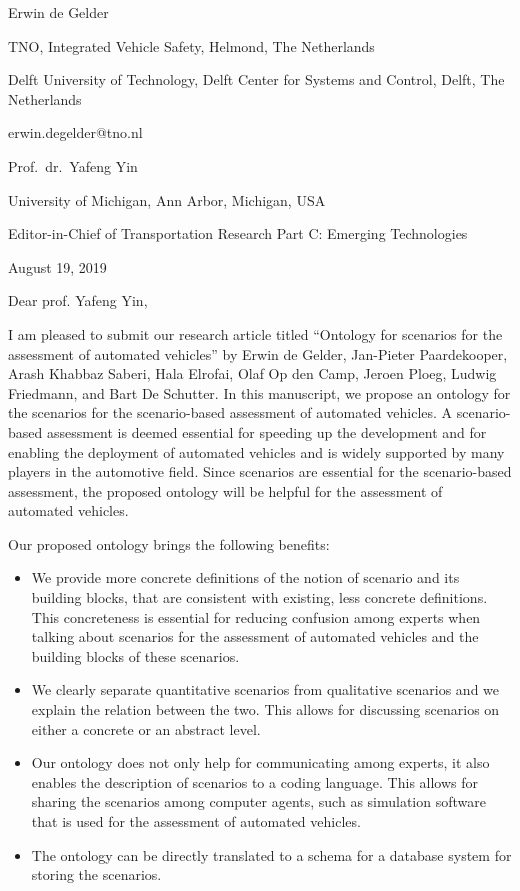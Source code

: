 \documentclass{article}
\begin{document}
Erwin de Gelder

TNO, Integrated Vehicle Safety, Helmond, The Netherlands

Delft University of Technology, Delft Center for Systems and Control, Delft, The Netherlands

erwin.degelder@tno.nl

\vspace{1em}

Prof.\ dr.\ Yafeng Yin

University of Michigan, Ann Arbor, Michigan, USA

Editor-in-Chief of Transportation Research Part C: Emerging Technologies

\vspace{1em}

August 19, 2019

\vspace{2em}


Dear prof. Yafeng Yin,

\vspace{1em}

I am pleased to submit our research article titled “Ontology for scenarios for the assessment of automated vehicles” by Erwin de Gelder, Jan-Pieter Paardekooper, Arash Khabbaz Saberi, Hala Elrofai, Olaf Op den Camp, Jeroen Ploeg, Ludwig Friedmann, and Bart De Schutter. In this manuscript, we propose an ontology for the scenarios for the scenario-based assessment of automated vehicles. A scenario-based assessment is deemed essential for speeding up the development and for enabling the deployment of automated vehicles and is widely supported by many players in the automotive field. Since scenarios are essential for the scenario-based assessment, the proposed ontology will be helpful for the assessment of automated vehicles.

Our proposed ontology brings the following benefits:
\begin{itemize}
	\item We provide more concrete definitions of the notion of scenario and its building blocks, that are consistent with existing, less concrete definitions. This concreteness is essential for reducing confusion among experts when talking about scenarios for the assessment of automated vehicles and the building blocks of these scenarios.
	\item We clearly separate quantitative scenarios from qualitative scenarios and we explain the relation between the two. This allows for discussing scenarios on either a concrete or an abstract level.
	\item Our ontology does not only help for communicating among experts, it also enables the description of scenarios to a coding language. This allows for sharing the scenarios among computer agents, such as simulation software that is used for the assessment of automated vehicles.
	\item The ontology can be directly translated to a schema for a database system for storing the scenarios.
\end{itemize}
\end{document}
